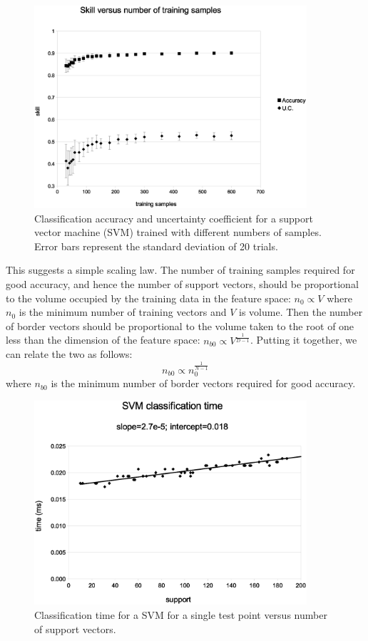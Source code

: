 \begin{figure}
\includegraphics[width=0.9\textwidth]{skill_v_nt}
\caption{Classification accuracy and uncertainty coefficient for a support vector machine (SVM) trained with different numbers of samples.
Error bars represent the standard deviation of 20 trials.}
\label{skill_v_nt}
\end{figure}

This suggests a simple scaling law. The number of training samples required
for good accuracy, and hence the number of support vectors, 
should be proportional to the volume occupied by the
training data in the feature space: $n_0 \propto V$ where 
$n_0$ is the minimum number of training vectors and $V$ is volume.
Then the number of border vectors should be proportional to the volume
taken to the root of one less than the dimension of the feature space:
$n_{b0} \propto V^\frac{1}{D-1}$.
Putting it together, we can relate the two as follows:
\begin{equation}
	n_{b0} \propto n_0^\frac{1}{N-1}
\end{equation}
where $n_{b0}$ is the minimum number of border vectors required for good
accuracy.

\begin{figure}
\includegraphics[width=0.9\textwidth]{svm_time}
\caption{Classification time for a SVM for a single test point versus number of support vectors.}
\label{svm_time}
\end{figure}

